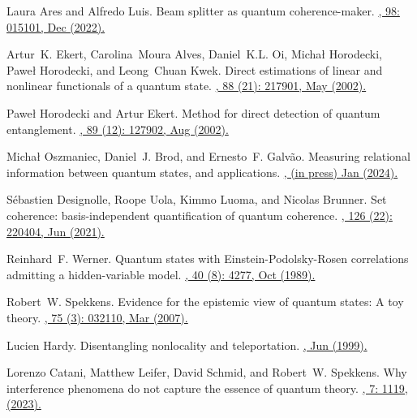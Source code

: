 \documentclass[letterpaper,onecolumn,12pt,accepted=2024-01-17]{article}
\begin{document}
\begin{thebibliography}{100}
Laura Ares and Alfredo Luis.
\newblock Beam splitter as quantum coherence-maker.
\href{http://dx.doi.org/10.1088/1402-4896/aca1e7}{, 98: 015101, Dec (2022).}

Artur~K. Ekert, Carolina~Moura Alves, Daniel~K.L. Oi, Micha{\l} Horodecki,
  Pawe{\l} Horodecki, and Leong~Chuan Kwek.
\newblock Direct estimations of linear and nonlinear functionals of a quantum
  state.
\href{https://doi.org/10.1103/PhysRevLett.88.217901}{, 88 (21): 217901, May (2002).}

Pawe{\l} Horodecki and Artur Ekert.
\newblock Method for direct detection of quantum entanglement.
\href{https://doi.org/10.1103/PhysRevLett.89.127902}{, 89 (12): 127902, Aug (2002).}

Micha{\l} Oszmaniec, Daniel~J. Brod, and Ernesto~F. Galv{\~a}o.
\newblock Measuring relational information between quantum states, and
  applications.
\href{http://dx.doi.org/10.1088/1367-2630/ad1a27}{, (in press) Jan (2024).}

S{\'e}bastien Designolle, Roope Uola, Kimmo Luoma, and Nicolas Brunner.
\newblock Set coherence: basis-independent quantification of quantum coherence.
\href{https://doi.org/10.1103/PhysRevLett.126.220404}{, 126 (22): 220404, Jun (2021).}

Reinhard~F. Werner.
\newblock Quantum states with {E}instein-{P}odolsky-{R}osen correlations
  admitting a hidden-variable model.
\href{https://doi.org/10.1103/PhysRevA.40.4277}{, 40 (8): 4277, Oct (1989).}

Robert~W. Spekkens.
\newblock Evidence for the epistemic view of quantum states: A toy theory.
\href{https://doi.org/10.1103/PhysRevA.75.032110}{, 75 (3): 032110, Mar (2007).}

Lucien Hardy.
\newblock Disentangling nonlocality and teleportation.
\href{https://doi.org/10.48550/arXiv.quant-ph/9906123}{, Jun (1999).}

Lorenzo Catani, Matthew Leifer, David Schmid, and Robert~W. Spekkens.
\newblock Why interference phenomena do not capture the essence of quantum
  theory.
\href{https://doi.org/10.22331/q-2023-09-25-1119}{, 7: 1119, (2023).}


\end{thebibliography}
\end{document}
